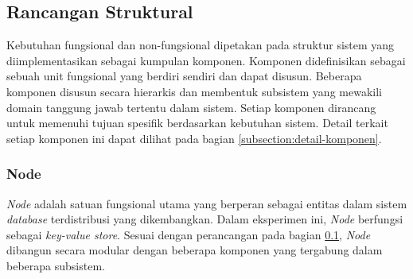 \subsection{Rancangan Struktural}
\label{subsection:rancangan-struktural}

Kebutuhan fungsional dan non-fungsional dipetakan pada struktur sistem yang diimplementasikan sebagai kumpulan komponen. Komponen didefinisikan sebagai sebuah unit fungsional yang berdiri sendiri dan dapat disusun. Beberapa komponen disusun secara hierarkis dan membentuk subsistem yang mewakili domain tanggung jawab tertentu dalam sistem. Setiap komponen dirancang untuk memenuhi tujuan spesifik berdasarkan kebutuhan sistem. Detail terkait setiap komponen ini dapat dilihat pada bagian \ref{subsection:detail-komponen}.

\subsubsection{Node}
\label{subsubsection:node}

\textit{Node} adalah satuan fungsional utama yang berperan sebagai entitas dalam sistem \textit{database} terdistribusi yang dikembangkan. Dalam eksperimen ini, \textit{Node} berfungsi sebagai \textit{key-value store}. Sesuai dengan perancangan pada bagian \ref{subsection:rancangan-struktural}, \textit{Node} dibangun secara modular dengan beberapa komponen yang tergabung dalam beberapa subsistem.




